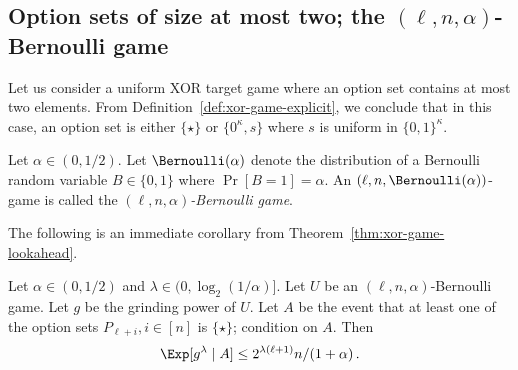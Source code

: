 
\subsection{Option sets of size at most two\texorpdfstring{; the $(\ell, n, \alpha)$-Bernoulli game}{}}

    Let us consider a uniform XOR target game where an option set 
    contains at most two elements. 
    From Definition~\ref{def:xor-game-explicit}, 
    we conclude that in this case, 
    an option set is either $\{\star\}$ 
    or $\{0^\kappa, s\}$ where $s$ is uniform in $\{0,1\}^\kappa$.


    \begin{definition}
        \label{def:static-game}\label{def:Bernoulli-game}
        Let $\alpha \in (0, 1/2)$. 
        Let $\Bernoulli(\alpha)$ denote the distribution of a Bernoulli random variable 
        $B \in \{0,1\}$ where $\Pr[B = 1] = \alpha$.
        An $(\ell, n, \Bernoulli(\alpha))$-game 
        is called the \emph{$(\ell, n, \alpha)$-Bernoulli game}.
    \end{definition}
    The following is an immediate corollary from Theorem~\ref{thm:xor-game-lookahead}.

    \begin{theorem}\label{thm:xor-game-playornot}
        Let $\alpha \in (0, 1/2)$ and $\lambda \in (0, \log_2(1/\alpha)]$. 
        Let $U$ be an $(\ell, n, \alpha)$-Bernoulli game. 
        Let $g$ be the grinding power of $U$. 
        Let $A$ be the event that 
        at least one of the option sets $P_{\ell + i}, i \in [n]$ is $\{\star\}$; 
        condition on $A$. 
        Then 
        $$
            \Exp [g^\lambda \mid A] \leq 2^{\lambda(\ell + 1)} n/(1+\alpha)
            \,.
        $$
    \end{theorem}

